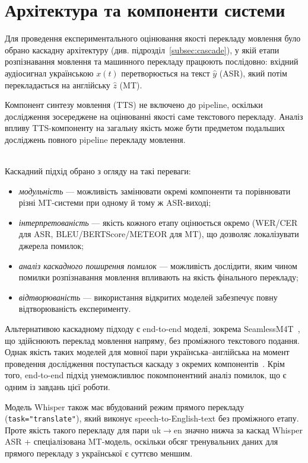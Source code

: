 \section{Архітектура та компоненти системи}

Для проведення експериментального оцінювання якості перекладу мовлення
було обрано каскадну архітектуру (див. підрозділ~\ref{subsec:cascade}), у якій етапи
розпізнавання мовлення та машинного перекладу працюють послідовно:
вхідний аудіосигнал українською $x(t)$ перетворюється на текст $\hat{y}$
(ASR), який потім перекладається на англійську $\hat{z}$ (MT).

Компонент синтезу мовлення (TTS) не включено до pipeline, оскільки
дослідження зосереджене на оцінюванні якості саме текстового перекладу.
Аналіз впливу TTS-компоненту на загальну якість може бути предметом
подальших досліджень повного pipeline перекладу мовлення.

\\
Каскадний підхід обрано з огляду на такі переваги:
\begin{itemize}[nosep]
    \item \textit{модульність} --- можливість замінювати окремі компоненти
    та порівнювати різні MT-системи при одному й тому ж ASR-виході;
    \item \textit{інтерпретованість} --- якість кожного етапу оцінюється
    окремо (WER/CER для ASR, BLEU/BERTScore/METEOR для MT), що дозволяє
    локалізувати джерела помилок;
    \item \textit{аналіз каскадного поширення помилок} --- можливість
    дослідити, яким чином помилки розпізнавання мовлення впливають на
    якість фінального перекладу;
    \item \textit{відтворюваність} --- використання відкритих моделей
    забезпечує повну відтворюваність експерименту.
\end{itemize}

Альтернативою каскадному підходу є end-to-end моделі, зокрема
\newline SeamlessM4T~\cite{seamlessm4t}, що здійснюють переклад мовлення напряму,
без проміжного текстового подання. Однак якість таких моделей для мовної
пари українська--англійська на момент проведення дослідження поступається
каскаду з окремих компонентів~\cite{seamlessm4t}. Крім того, end-to-end
підхід унеможливлює покомпонентний аналіз помилок, що є одним із завдань
цієї роботи.

Модель Whisper також має вбудований режим прямого перекладу
\newline(\texttt{task="translate"}), який виконує speech-to-English-text без
проміжного етапу. Проте якість такого перекладу для пари uk$\to$en значно
нижча за каскад Whisper ASR + спеціалізована MT-модель, оскільки обсяг
тренувальних даних для прямого перекладу з української є суттєво меншим.

